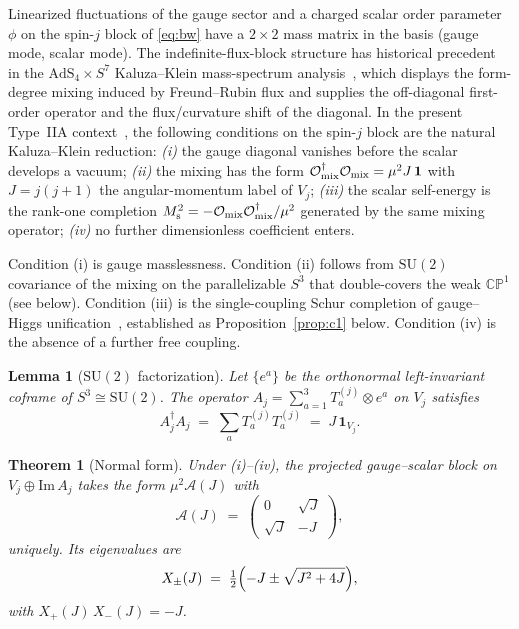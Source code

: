 \documentclass[aps,prl,twocolumn,superscriptaddress,floatfix,nofootinbib,reprint]{revtex4-2}
\newtheorem{theorem}{Theorem}
\newtheorem{lemma}{Lemma}
\newcommand{\cA}{\mathcal{A}}
\newcommand{\SU}{\mathrm{SU}}
\newcommand{\CP}{\mathbb{CP}}
\newcommand{\AdS}{\mathrm{AdS}}
\begin{document}
Linearized fluctuations of the gauge sector and a charged scalar order
parameter $\phi$ on the spin-$j$ block of \eqref{eq:bw} have a
$2\times 2$ mass matrix in the basis (gauge mode, scalar mode).  The
indefinite-flux-block structure has historical precedent in the
$\AdS_{4}\times S^{7}$ Kaluza--Klein mass-spectrum
analysis~\cite{CasherEnglertNicolaiRooman1984,DuffNilssonPope1986},
which displays the form-degree mixing induced by Freund--Rubin flux
and supplies the off-diagonal first-order operator and the
flux/curvature shift of the diagonal.  In the present Type~IIA
context~\cite{KoerberLustTsimpis2008,HertzbergKachruTaylorTegmark2007},
the following conditions on the spin-$j$ block are the natural
Kaluza--Klein reduction:
\emph{(i)} the gauge diagonal vanishes before the scalar develops a
vacuum;
\emph{(ii)} the mixing has the form
$\mathcal{O}_{\rm mix}^{\dagger}\mathcal{O}_{\rm mix}=\mu^{2}J\,\mathbf{1}$
with $J=j(j+1)$ the angular-momentum label of $V_{j}$;
\emph{(iii)} the scalar self-energy is the rank-one completion
$M_{\rm s}^{2}=-\mathcal{O}_{\rm mix}\mathcal{O}_{\rm mix}^{\dagger}/\mu^{2}$
generated by the same mixing operator;
\emph{(iv)} no further dimensionless coefficient enters.

Condition (i) is gauge masslessness.  Condition (ii) follows from
$\SU(2)$ covariance of the mixing on the parallelizable $S^{3}$
that double-covers the weak $\CP^{1}$ (see below).  Condition (iii)
is the single-coupling Schur completion of gauge--Higgs
unification~\cite{Manton1979,Fairlie1979,Hosotani1983}, established
as Proposition~\ref{prop:c1} below.  Condition (iv) is the absence
of a further free coupling.

\begin{lemma}[$\SU(2)$ factorization]
\label{lem:cas}
Let $\{e^{a}\}$ be the orthonormal left-invariant coframe of
$S^{3}\cong\SU(2)$.  The operator
$A_{j}=\sum_{a=1}^{3}T_{a}^{(j)}\otimes e^{a}$ on $V_{j}$ satisfies
\begin{equation}
  A_{j}^{\dagger}A_{j}\;=\;\sum_{a}T_{a}^{(j)}T_{a}^{(j)}\;=\;J\,\mathbf{1}_{V_{j}}.
\label{eq:cas}
\end{equation}
\end{lemma}

\begin{theorem}[Normal form]
\label{thm:nf}
Under \emph{(i)--(iv)}, the projected gauge--scalar block on
$V_{j}\oplus\mathrm{Im}\,A_{j}$ takes the form $\mu^{2}\cA(J)$ with
\begin{equation}
  \cA(J)\;=\;\begin{pmatrix} 0 & \sqrt{J}\\ \sqrt{J} & -J\end{pmatrix},
\label{eq:Aj}
\end{equation}
uniquely.  Its eigenvalues are
\begin{equation}
  X_{\pm}(J)\;=\;\tfrac{1}{2}\Bigl(-J\pm\sqrt{J^{2}+4J}\Bigr),
\label{eq:Xpm}
\end{equation}
with $X_{+}(J)\,X_{-}(J)=-J$.
\end{theorem}
\end{document}
